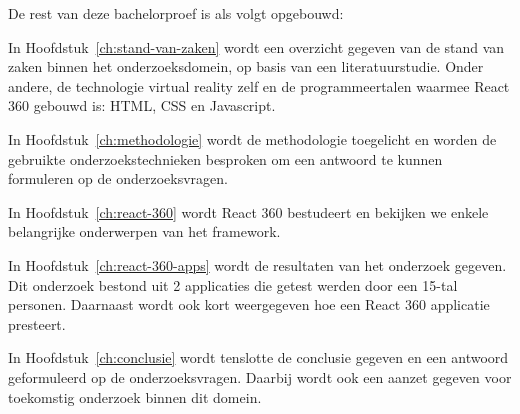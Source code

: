 
De rest van deze bachelorproef is als volgt opgebouwd:

In Hoofdstuk~\ref{ch:stand-van-zaken} wordt een overzicht gegeven van de stand van zaken binnen het onderzoeksdomein, op basis van een literatuurstudie. Onder andere, de technologie virtual reality zelf en de programmeertalen waarmee React 360 gebouwd is: HTML, CSS en Javascript.

In Hoofdstuk~\ref{ch:methodologie} wordt de methodologie toegelicht en worden de gebruikte onderzoekstechnieken besproken om een antwoord te kunnen formuleren op de onderzoeksvragen.

In Hoofdstuk~\ref{ch:react-360} wordt React 360 bestudeert en bekijken we enkele belangrijke onderwerpen van het framework.

In Hoofdstuk~\ref{ch:react-360-apps} wordt de resultaten van het onderzoek gegeven. Dit onderzoek bestond uit 2 applicaties die getest werden door een 15-tal personen. Daarnaast wordt ook kort weergegeven hoe een React 360 applicatie presteert.

In Hoofdstuk~\ref{ch:conclusie} wordt tenslotte de conclusie gegeven en een antwoord geformuleerd op de onderzoeksvragen. Daarbij wordt ook een aanzet gegeven voor toekomstig onderzoek binnen dit domein.

